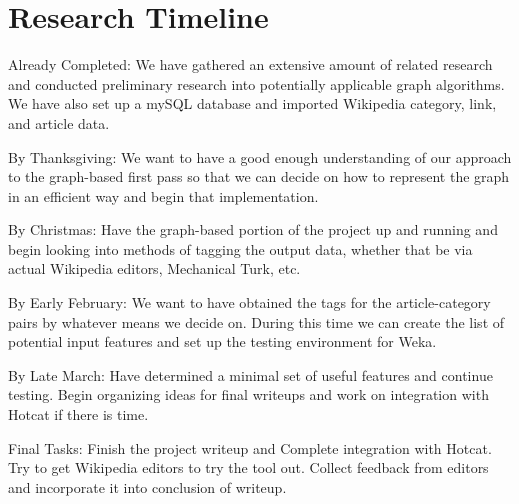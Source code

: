 \documentclass{sig-alternate}
\begin{document}
\section{Research Timeline}
\label{sec:research_timeline}
\begin{itemize*}
	\item {\sc Already Completed}: We have gathered an extensive amount of related research and conducted preliminary research into potentially applicable graph algorithms. We have also set up a mySQL database and imported Wikipedia category, link, and article data.\vspace{3pt}
	\item {\sc By Thanksgiving}: We want to have a good enough understanding of our approach to the graph-based first pass so that we can decide on how to represent the graph in an efficient way and begin that implementation.\vspace{3pt}
	\item {\sc By Christmas}: Have the graph-based portion of the project up and running and begin looking into methods of tagging the output data, whether that be via actual Wikipedia editors, Mechanical Turk, etc.\vspace{3pt}
	\item {\sc By Early February}: We want to have obtained the tags for the article-category pairs by whatever means we decide on. During this time we can create the list of potential input features and set up the testing environment for Weka.\vspace{3pt}
	\item {\sc By Late March}: Have determined a minimal set of useful features and continue testing. Begin organizing ideas for final writeups and work on integration with Hotcat if there is time.\vspace{3pt}
	\item {\sc Final Tasks}: Finish the project writeup and Complete integration with Hotcat. Try to get Wikipedia editors to try the tool out. Collect feedback from editors and incorporate it into conclusion of writeup.
\end{itemize*}

\nocite{*}
\end{document}
